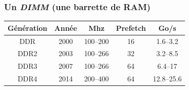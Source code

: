 \documentclass[xcolor={x11names,svgnames}, 14pt]{beamer}
\begin{document}

\begin{frame}
  \frametitle{Un \emph{DIMM} (une \og barrette de RAM\fg{})}


  \vfill
  
  \centering\small
  \begin{tabular}{|c|c|c|c|c|}
  \hline
  Génération     & Année & Mhz       & Prefetch  & Go/s \\
  \hline\hline                                                    
  DDR\phantom{1} & 2000  & 100--200  & 16        &  1.6--3.2 \\
  \hline                                                          
  DDR2           & 2003  & 100--266  & 32        &  3.2--8.5 \\
  \hline                                                          
  DDR3           & 2007  & 100--266  & 64        &  6.4--17 \\
  \hline                                                          
  DDR4           & 2014  & 200--400  & 64        &  12.8--25.6 \\
    \hline
\end{tabular}
\vfill
\end{frame}

\end{document}
